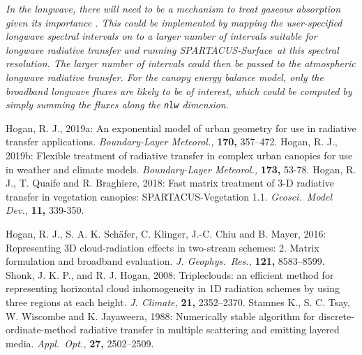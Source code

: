 \documentclass[a4,oneside]{article}
\def\codesize{\small}
\def\spsurf{\emph{SPARTACUS-Surface}}
\def\code#1{{\codesize\texttt{#1}}}
\begin{document}
\emph{In the longwave, there will need to be a mechanism to treat
  gaseous absorption given its importance \cite[]{Hogan2019b}. This
  could be implemented by mapping the user-specified longwave spectral
  intervals on to a larger number of intervals suitable for longwave
  radiative transfer and running \spsurf\ at this spectral resolution.
  The larger number of intervals could then be passed to the
  atmospheric longwave radiative transfer.  For the canopy energy
  balance model, only the broadband longwave fluxes are likely to be
  of interest, which could be computed by simply summing the fluxes along
  the \code{nlw} dimension.}

\begin{thebibliography}{00}
%
Hogan, R. J., 2019a: An
exponential model of urban geometry for use in radiative transfer
applications. \textit{Boundary-Layer Meteorol.,} \textbf{170,}
357--472.
%
Hogan, R. J., 2019b: Flexible
treatment of radiative transfer in complex urban canopies for use in
weather and climate models. \textit{Boundary-Layer Meteorol.,}
\textbf{173,} 53-78.
%
Hogan, R. J., T. Quaife
and R. Braghiere, 2018: Fast matrix treatment of 3-D radiative
transfer in vegetation canopies: SPARTACUS-Vegetation
1.1. \textit{Geosci.\ Model Dev.,} \textbf{11,} 339-350.
%

%
%
Hogan, R. J.,
S. A. K. Sch\"afer, C. Klinger, J.-C. Chiu and B. Mayer, 2016:
Representing 3D cloud-radiation effects in two-stream schemes:
2. Matrix formulation and broadband
evaluation. \textit{J. Geophys.\ Res.,} \textbf{121,} 8583--8599.
%
%
Shonk, J. K. P., and
R. J. Hogan, 2008: Tripleclouds: an efficient method for representing
horizontal cloud inhomogeneity in 1D radiation schemes by using three
regions at each height. \textit{J. Climate,} \textbf{21,} 2352--2370.
%
Stamnes K.,
S. C. Tsay, W. Wiscombe and K. Jayaweera, 1988: Numerically stable
algorithm for discrete-ordinate-method radiative transfer in multiple
scattering and emitting layered media. \textit{Appl.\ Opt.,}
\textbf{27,} 2502--2509.
\end{thebibliography}
\end{document}
